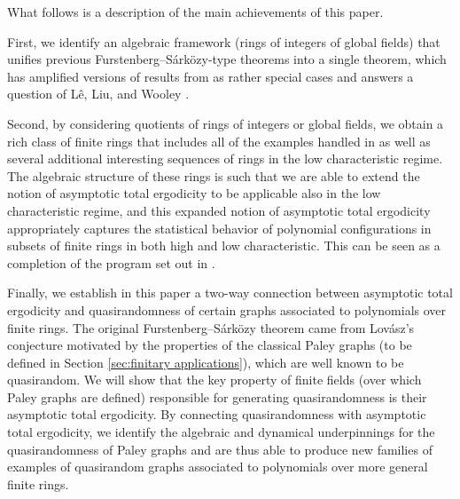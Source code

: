 \documentclass{amsart}
\theoremstyle{definition}
\numberwithin{equation}{section}
\begin{document}
What follows is a description of the main achievements of this paper.

First, we identify an algebraic framework (rings of integers of global fields) that unifies previous Furstenberg--S\'{a}rk\"{o}zy-type theorems into a single theorem, which has amplified versions of results from \cite{br, bl} as rather special cases and answers a question of L\^{e}, Liu, and Wooley \cite{llw}.

Second, by considering quotients of rings of integers or global fields, we obtain a rich class of finite rings that includes all of the examples handled in \cite{bb1,bb2} as well as several additional interesting sequences of rings in the low characteristic regime.
The algebraic structure of these rings is such that we are able to extend the notion of asymptotic total ergodicity to be applicable also in the low characteristic regime, and this expanded notion of asymptotic total ergodicity appropriately captures the statistical behavior of polynomial configurations in subsets of finite rings in both high and low characteristic.
This can be seen as a completion of the program set out in \cite{bb1}.

Finally, we establish in this paper a two-way connection between asymptotic total ergodicity and quasirandomness of certain graphs associated to polynomials over finite rings.
The original Furstenberg--S\'{a}rk\"{o}zy theorem came from Lov\'{a}sz's conjecture motivated by the properties of the classical Paley graphs (to be defined in Section \ref{sec:finitary applications}), which are well known to be quasirandom.
We will show that the key property of finite fields (over which Paley graphs are defined) responsible for generating quasirandomness is their asymptotic total ergodicity.
By connecting quasirandomness with asymptotic total ergodicity, we identify the algebraic and dynamical underpinnings for the quasirandomness of Paley graphs and are thus able to produce new families of examples of quasirandom graphs associated to polynomials over more general finite rings. \\
\end{document}
